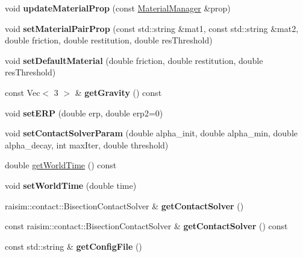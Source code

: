 \begin{DoxyCompactItemize}
\item 
\mbox{\label{classraisim_1_1World_af29193c10d50be6c7220ad34975633df}} 
void {\bfseries update\+Material\+Prop} (const \hyperlink{classraisim_1_1MaterialManager}{Material\+Manager} \&prop)
\item 
\mbox{\label{classraisim_1_1World_a460e211f19c960fcfdf9c81dbaa0538f}} 
void {\bfseries set\+Material\+Pair\+Prop} (const std\+::string \&mat1, const std\+::string \&mat2, double friction, double restitution, double res\+Threshold)
\item 
\mbox{\label{classraisim_1_1World_ac91b2303e43b842638ab4ae88e3a193d}} 
void {\bfseries set\+Default\+Material} (double friction, double restitution, double res\+Threshold)
\item 
\mbox{\label{classraisim_1_1World_a1767a3ae02534ac707381ab8138437e7}} 
const Vec$<$ 3 $>$ \& {\bfseries get\+Gravity} () const
\item 
\mbox{\label{classraisim_1_1World_a84c71acd5dac4ab5868efe52116a8ac2}} 
void {\bfseries set\+E\+RP} (double erp, double erp2=0)
\item 
\mbox{\label{classraisim_1_1World_a04652565066b463dd2b8279ddff059da}} 
void {\bfseries set\+Contact\+Solver\+Param} (double alpha\+\_\+init, double alpha\+\_\+min, double alpha\+\_\+decay, int max\+Iter, double threshold)
\item 
double \hyperlink{classraisim_1_1World_af6e0d20c1368ca22a19163dd4deb850c}{get\+World\+Time} () const
\item 
\mbox{\label{classraisim_1_1World_a36197ccbee4dbeef14897270bcdba93c}} 
void {\bfseries set\+World\+Time} (double time)
\item 
\mbox{\label{classraisim_1_1World_acd5f454aba0991dbab3d961b2bdaa6e2}} 
raisim\+::contact\+::\+Bisection\+Contact\+Solver \& {\bfseries get\+Contact\+Solver} ()
\item 
\mbox{\label{classraisim_1_1World_adfd7e4a0c42dbea55f096dc00f909315}} 
const raisim\+::contact\+::\+Bisection\+Contact\+Solver \& {\bfseries get\+Contact\+Solver} () const
\item 
\mbox{\label{classraisim_1_1World_a7e8185b70f52ac1d0d184c34a08d885d}} 
const std\+::string \& {\bfseries get\+Config\+File} ()
\end{DoxyCompactItemize}

